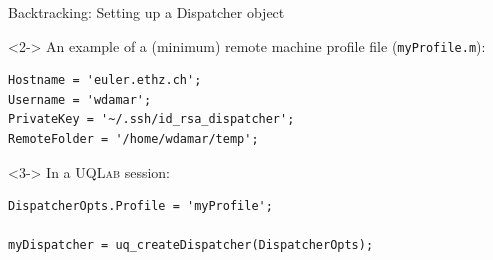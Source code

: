 \documentclass[]{rsuqbeamernew}
\begin{document}
\begin{frame}[fragile]{Backtracking: Setting up a Dispatcher object}



\begin{onslide}<2->
An example of a (minimum) remote machine profile file (\texttt{myProfile.m}):
\begin{lstlisting}[basicstyle=\scriptsize]
Hostname = 'euler.ethz.ch';
Username = 'wdamar';
PrivateKey = '~/.ssh/id_rsa_dispatcher';
RemoteFolder = '/home/wdamar/temp';
\end{lstlisting}
\end{onslide}

\begin{onslide}<3->
In a \textsc{UQLab} session:
\begin{lstlisting}[basicstyle=\scriptsize,numbers=none]
DispatcherOpts.Profile = 'myProfile';
  
myDispatcher = uq_createDispatcher(DispatcherOpts);
\end{lstlisting}
\end{onslide}

\end{frame}
\end{document}

